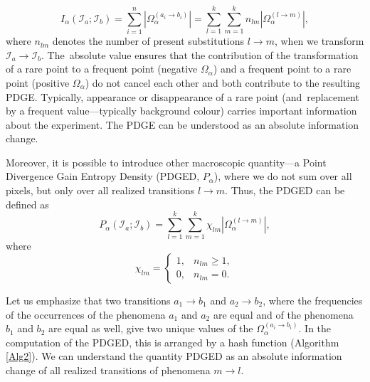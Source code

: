 \documentclass[entropy,article,accept,moreauthors,pdftex,10pt,a4paper]{mdpi}
\begin{document}
\begin{equation}
I_\alpha(\mathcal{I}_a;\mathcal{I}_b)= \sum_{i=1}^n |\Omega_\alpha^{(a_i \rightarrow b_i)}| =  \sum_{l=1}^{k} \sum_{m=1}^{k} n_{lm} |\Omega_\alpha^{(l \rightarrow m)}|,
\label{eq:13}
\end{equation}
where $n_{lm}$ denotes the number of present substitutions $l \rightarrow m$, when we transform $\mathcal{I}_a \rightarrow \mathcal{I}_b$. The~absolute value ensures that the contribution of the transformation of a rare point to a frequent point (negative $\Omega_\alpha$) and a frequent point to a rare point (positive $\Omega_\alpha$) do not cancel each other and both contribute to the resulting PDGE. Typically, appearance or disappearance of a rare point (and~replacement by a frequent value---typically background colour) carries important information about the experiment. The PDGE can be understood as an absolute information change.

Moreover, it is possible to introduce other macroscopic quantity---a Point Divergence Gain Entropy Density (PDGED, $P_\alpha$), where we do not sum over all pixels, but only over all realized transitions $l \rightarrow m$. Thus, the PDGED can be defined as
\begin{equation}
P_\alpha(\mathcal{I}_a;\mathcal{I}_b) = \sum_{l=1}^{k} \sum_{m=1}^{k} \chi_{lm} |\Omega_\alpha^{(l \rightarrow m)}|,
\label{eq:14}
\end{equation}
where
\begin{equation}
\chi_{lm} = \left\{
                          \begin{array}{ll}
                            1, & n_{lm} \geq 1,\\
                            0, & n_{lm} = 0.
                          \end{array}
                        \right.
\end{equation}

Let us emphasize that two transitions $a_1 \rightarrow b_1$ and $a_2 \rightarrow b_2$, where the frequencies of the occurrences of the phenomena $a_1$ and $a_2$ are equal and of the phenomena $b_1$ and $b_2$ are equal as well, give two unique values of the $\Omega_\alpha^{(a_i \rightarrow b_i)}$. In the computation of the PDGED, this is arranged by a hash function (Algorithm \ref{Alg2}). We can understand the quantity PDGED as an absolute information change of all realized transitions of phenomena $m \rightarrow l$.

\BlankLine
\BlankLine
\end{document}

